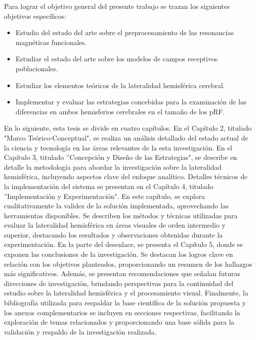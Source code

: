 \documentclass{article}
\begin{document}
	Para lograr el objetivo general del presente trabajo se
	trazan los siguientes objetivos específicos:
	
	\begin{itemize}
		\item Estudio del estado del arte sobre el preprocesamiento de las resonancias magn\'eticas funcionales.
		\item Estudiar el estado del arte sobre los modelos de campos receptivos poblacionales.
		\item Estudiar los elementos te\'oricos de la lateralidad hemisf\'erica cerebral.
		\item Implementar y evaluar las estrategias concebidas para la examinaci\'on de las diferencias en ambos hemisferios cerebrales en el tama\~no de los pRF.
	
	\end{itemize}

En lo siguiente, esta tesis se divide en cuatro capítulos.  En el Capítulo 2, titulado "Marco Teórico-Conceptual", se realiza un análisis detallado del estado actual de la ciencia y tecnología en las áreas relevantes de la esta investigaci\'on. En el Capítulo 3, titulado ''Concepción y Diseño de las Estrategias", se describe en detalle la metodología para abordar la investigación sobre la lateralidad hemisférica, incluyendo aspectos clave del enfoque analítico. Detalles técnicos de la implementación del sistema se presentan en el Capítulo 4, titulado ''Implementación y Experimentación". En este capítulo, se explora cualitativamente la validez de la solución implementada, aprovechando las herramientas disponibles. Se describen los métodos y técnicas utilizadas para evaluar la lateralidad hemisférica en áreas visuales de orden intermedio y superior, destacando los resultados y observaciones obtenidas durante la experimentación. En la parte del desenlace, se presenta el Capítulo 5, donde se exponen las conclusiones de la investigación. Se destacan los logros clave en relación con los objetivos planteados, proporcionando un resumen de los hallazgos más significativos. Además, se presentan recomendaciones que señalan futuras direcciones de investigación, brindando perspectivas para la continuidad del estudio sobre la lateralidad hemisférica y el procesamiento visual. Finalmente, la bibliografía utilizada para respaldar la base científica de la solución propuesta y los anexos complementarios se incluyen en secciones respectivas, facilitando la exploración de temas relacionados y proporcionando una base sólida para la validación y respaldo de la investigación realizada.
	
\end{document}
